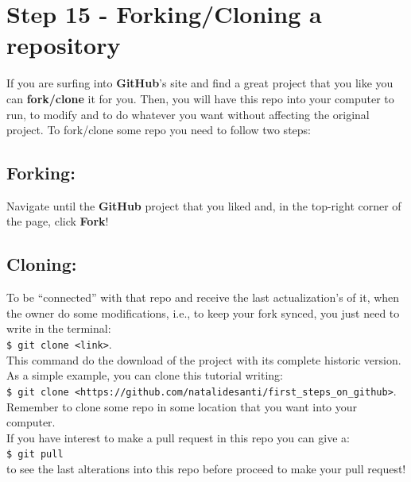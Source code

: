 \documentclass[12pt,a4paper,titlepage,brazil]{article}
\begin{document}
{\section{Step 15 - Forking/Cloning a repository}

If you are surfing into {\bf GitHub}'s site and find a great project that you like you can {\bf fork/clone} it for you. Then, you will have this repo into your computer to run, to modify and to do whatever you want without affecting the original project. To fork/clone some repo you need to follow two steps:

\subsection{Forking:}

Navigate until the {\bf GitHub} project that you liked and, in the top-right corner of the page, click {\bf Fork}!

\subsection{Cloning:}

To be ``connected'' with that repo and receive the last actualization's of it, when the owner do some modifications, i.e., to keep your fork synced, you just need to write in the terminal:\\

\texttt{\$ git clone <link>}.\\

This command do the download of the project with its complete historic version. As a simple example, you can clone this tutorial writing:\\

\texttt{\$ git clone <https://github.com/natalidesanti/first\_steps\_on\_github>}.\\

Remember to clone some repo in some location that you want into your computer.\\

If you have interest to make a pull request in this repo you can give a:\\

\texttt{\$ git pull}\\

to see the last alterations into this repo before proceed to make your pull request!


}
\end{document}

